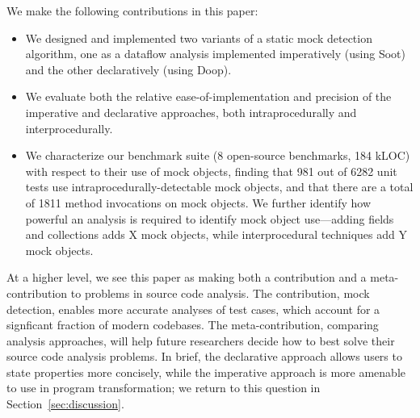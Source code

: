 We make the following contributions in this paper:
\begin{itemize}
\item We designed and implemented two variants of a static mock detection algorithm, one as a dataflow analysis implemented imperatively (using Soot) and the other declaratively (using Doop).
\item We evaluate both the relative ease-of-implementation and precision of the imperative and declarative approaches, both intraprocedurally and interprocedurally. %
\item We characterize our benchmark suite (8 open-source benchmarks, 184 kLOC) with respect to their use of mock objects, finding that 981 out of 6282 unit tests use intraprocedurally-detectable mock objects, and that there are a total of 1811 method invocations on mock objects. We further identify how powerful an analysis is required to identify mock object use---adding fields and collections adds X mock objects, while interprocedural techniques add Y mock objects.
\end{itemize}
At a higher level, we see this paper as making both a contribution and a meta-contribution to
problems in source code analysis. The contribution, mock detection, enables more accurate analyses
of test cases, which account for a signficant fraction of modern codebases. The meta-contribution,
comparing analysis approaches, will help future researchers decide how to best solve their
source code analysis problems. In brief, the declarative approach allows users to state properties more
concisely, while the imperative approach is more amenable to use in program transformation; we return
to this question in Section~\ref{sec:discussion}.

